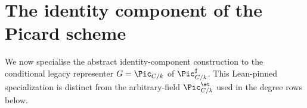 \section{The identity component of the Picard scheme}
\label{sec:pic0_definition}

We now specialise the abstract identity-component construction to the
conditional legacy representer \(G = \Pic_{C/k}\) of
\(\Pic^\sharp_{C/k}\). This Lean-pinned specialization is distinct from the
arbitrary-field \(\Pic^{\et}_{C/k}\) used in the degree rows below.

\begin{definition}\leanok
  \label{def:pic_zero_subscheme}


\end{definition}
